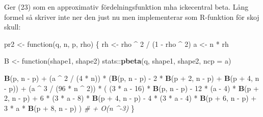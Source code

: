 \documentclass[]{article}
\newenvironment{Shaded}{\begin{snugshade}}{\end{snugshade}}
\newcommand{\KeywordTok}[1]{\textcolor[rgb]{0.13,0.29,0.53}{\textbf{{#1}}}}
\newcommand{\DataTypeTok}[1]{\textcolor[rgb]{0.13,0.29,0.53}{{#1}}}
\newcommand{\DecValTok}[1]{\textcolor[rgb]{0.00,0.00,0.81}{{#1}}}
\newcommand{\StringTok}[1]{\textcolor[rgb]{0.31,0.60,0.02}{{#1}}}
\newcommand{\CommentTok}[1]{\textcolor[rgb]{0.56,0.35,0.01}{\textit{{#1}}}}
\newcommand{\NormalTok}[1]{{#1}}
\begin{document}
Ger (23) som en approximativ fördelningsfunktion mha ickecentral beta.
Lång formel så skriver inte ner den just nu men implementerar som
R-funktion för skoj skull:

\begin{Shaded}
\begin{Highlighting}[]
\NormalTok{pr2 <-}\StringTok{ }\NormalTok{function(q, n, p, rho) \{}
  \NormalTok{rh <-}\StringTok{ }\NormalTok{rho ^}\StringTok{ }\DecValTok{2} \NormalTok{/}\StringTok{ }\NormalTok{(}\DecValTok{1} \NormalTok{-}\StringTok{ }\NormalTok{rho ^}\StringTok{ }\DecValTok{2}\NormalTok{)}
  \NormalTok{a <-}\StringTok{ }\NormalTok{n *}\StringTok{ }\NormalTok{rh}
  
  \NormalTok{B <-}\StringTok{ }\NormalTok{function(shape1, shape2) stats::}\KeywordTok{pbeta}\NormalTok{(q, shape1, shape2,  }\DataTypeTok{ncp =} \NormalTok{a)}
  
  \KeywordTok{B}\NormalTok{(p, n -}\StringTok{ }\NormalTok{p) +}\StringTok{ }
\StringTok{  }\NormalTok{(a ^}\StringTok{ }\DecValTok{2} \NormalTok{/}\StringTok{ }\NormalTok{(}\DecValTok{4} \NormalTok{*}\StringTok{ }\NormalTok{n))      *}\StringTok{ }\NormalTok{(}\KeywordTok{B}\NormalTok{(p, n -}\StringTok{ }\NormalTok{p) -}\StringTok{ }\DecValTok{2} \NormalTok{*}\StringTok{ }\KeywordTok{B}\NormalTok{(p +}\StringTok{ }\DecValTok{2}\NormalTok{, n -}\StringTok{ }\NormalTok{p) +}\StringTok{ }\KeywordTok{B}\NormalTok{(p +}\StringTok{ }\DecValTok{4}\NormalTok{, n -}\StringTok{ }\NormalTok{p)) +}\StringTok{ }
\StringTok{  }\NormalTok{(a ^}\StringTok{ }\DecValTok{3} \NormalTok{/}\StringTok{ }\NormalTok{(}\DecValTok{96} \NormalTok{*}\StringTok{ }\NormalTok{n ^}\StringTok{ }\DecValTok{2}\NormalTok{)) *}\StringTok{ }\NormalTok{(}
    \NormalTok{(}\DecValTok{3} \NormalTok{*}\StringTok{ }\NormalTok{a -}\StringTok{ }\DecValTok{16}\NormalTok{) *}\StringTok{ }\KeywordTok{B}\NormalTok{(p, n -}\StringTok{ }\NormalTok{p) -}\StringTok{ }\DecValTok{12} \NormalTok{*}\StringTok{ }\NormalTok{(a -}\StringTok{ }\DecValTok{4}\NormalTok{) *}\StringTok{ }\KeywordTok{B}\NormalTok{(p +}\StringTok{ }\DecValTok{2}\NormalTok{, n -}\StringTok{ }\NormalTok{p) +}
\StringTok{    }\DecValTok{6} \NormalTok{*}\StringTok{ }\NormalTok{(}\DecValTok{3} \NormalTok{*}\StringTok{ }\NormalTok{a -}\StringTok{ }\DecValTok{8}\NormalTok{) *}\StringTok{ }\KeywordTok{B}\NormalTok{(p +}\StringTok{ }\DecValTok{4}\NormalTok{, n -}\StringTok{ }\NormalTok{p) -}\StringTok{ }\DecValTok{4} \NormalTok{*}\StringTok{ }\NormalTok{(}\DecValTok{3} \NormalTok{*}\StringTok{ }\NormalTok{a -}\StringTok{ }\DecValTok{4}\NormalTok{) *}\StringTok{ }\KeywordTok{B}\NormalTok{(p +}\StringTok{ }\DecValTok{6}\NormalTok{, n -}\StringTok{ }\NormalTok{p) +}
\StringTok{    }\DecValTok{3} \NormalTok{*}\StringTok{ }\NormalTok{a *}\StringTok{ }\KeywordTok{B}\NormalTok{(p +}\StringTok{ }\DecValTok{8}\NormalTok{, n -}\StringTok{ }\NormalTok{p)}
  \NormalTok{) }\CommentTok{# + O(n ^-3)}
\NormalTok{\}}


\end{Highlighting}
\end{Shaded}
\end{document}
